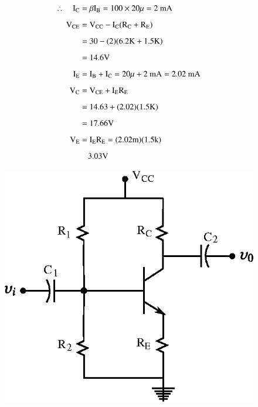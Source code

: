 \begin{solution}
\begin{align*}
\therefore\quad \textrm{I}_{\textrm{C}} &= \beta \textrm{I}_{\textrm{B}}=100\times 20\mu = 2\text{~mA}\\[5pt]
\textrm{V}_{\text{CE}} &= \textrm{V}_{\text{CC}}-\textrm{I}_{\textrm{C}}(\textrm{R}_{\textrm{C}}+\textrm{R}_{\textrm{E}})\\[5pt]
&= 30-(2\rm)(6.2\textrm{K}+1.5\textrm{K})\\[5pt]
&= 14.6\textrm{V}\\[5pt]
\textrm{I}_{\textrm{E}} &= \textrm{I}_{\textrm{B}}+\textrm{I}_{\textrm{C}}=20\mu+2\text{~mA}=2.02\text{~mA}\\[5pt]
\textrm{V}_{\textrm{C}} &= \textrm{V}_{\text{CE}}+\textrm{I}_{\textrm{E}}\textrm{R}_{\textrm{E}}\\[5pt]
&= 14.63+(2.02\rm)(1.5\textrm{K})\\[5pt]
&= 17.66\textrm{V}\\[5pt]
\textrm{V}_{\textrm{E}} &= \textrm{I}_{\textrm{E}}\textrm{R}_{\textrm{E}}=(2.02\textrm{m})(1.5\textrm{k})\\[5pt]
&\quad 3.03\textrm{V}
\end{align*}
\end{solution}

\eject

\begin{figure}[H]
\centering
\includegraphics{chap3/fig3.20.eps}
\end{figure}

